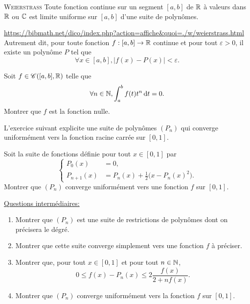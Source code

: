 \begin{theo}{\textsc{Weierstrass}}
    Toute fonction continue sur un segment $[a, b]$ de $\mathbb{R}$ à valeurs dans $\mathbb{R}$ ou $\mathbb{C}$ est limite uniforme sur $[a, b]$ d'une suite de polynômes.
\end{theo}

\url{https://bibmath.net/dico/index.php?action=affiche&quoi=./w/weierstrass.html} Autrement dit, pour toute fonction $f : [a, b] \to \mathbb{R}$ continue et pour tout $\varepsilon > 0$, il existe un polynôme $P$ tel que
$$\forall x \in [a, b], |f(x) - P(x)| < \varepsilon.$$

\begin{preuve}
\end{preuve} 

\begin{exercice}
    Soit $f \in \mathscr{C}([a, b], \mathbb{R})$ telle que
    $$\forall n \in \mathbb{N}, \int_a^b f(t) t^n \, \mathrm{d} t = 0.$$
    Montrer que $f$ est la fonction nulle.
\end{exercice}

\begin{solution}

\end{solution}

L'exercice suivant explicite une suite de polynômes $(P_n)$ qui converge uniformément vers la fonction racine carrée sur $[0, 1]$.

\begin{exercice}
    Soit la suite de fonctions définie pour tout $x \in [0, 1]$ par
    $$
    \begin{cases}
        P_0(x) &= 0,\\
        P_{n+1}(x) &= P_n (x) + \frac{1}{2} \big( x-P_n (x)^2 \big).
    \end{cases}
    $$
    Montrer que $(P_n)$ converge uniformément vers une fonction $f$ sur $[0, 1]$.
\end{exercice}

\underline{Questions intermédiaires:} \\
\begin{enumerate}
    \item Montrer que $(P_n)$ est une suite de restrictions de polynômes dont on précisera le dégré.
    \item Montrer que cette suite converge simplement vers une fonction $f$ à préciser.
    \item Montrer que, pour tout $x \in [0, 1]$ et pour tout $n \in \mathbb{N}$,
    $$0 \leqslant f(x) - P_n(x) \leqslant 2 \frac{f(x)}{2 + nf(x)}.$$
    \item Montrer que $(P_n)$ converge uniformément vers la fonction $f$ sur $[0, 1]$.
\end{enumerate}

